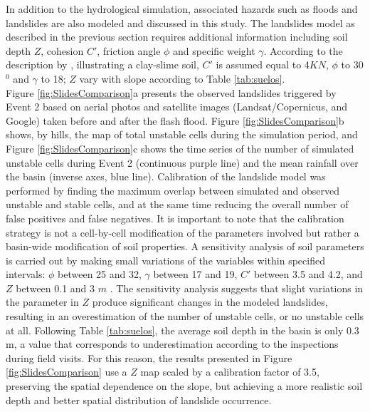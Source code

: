 \documentclass[hess, manuscript]{copernicus} %
\begin{document}
In addition to the hydrological simulation, associated hazards such as floods and landslides are also modeled and discussed in this study. The landslides model as described in the previous section requires additional information including soil depth $Z$, cohesion $C'$, friction angle $\phi$ and specific weight $\gamma$.  According to the  description by  \citet{Osorio2008}, illustrating a clay-slime soil,   $C'$  is  assumed equal to 4$KN$, $\phi$ to 30$^0$ and $\gamma$ to 18; $Z$ vary with slope according to Table \ref{tab:suelos}. \\

Figure \ref{fig:SlidesComparison}a presents the observed landslides triggered by Event 2  based on aerial photos and satellite images (Landsat/Copernicus, and Google) taken before and after the flash flood.  Figure \ref{fig:SlidesComparison}b shows,  by hills, the map of total unstable cells during the simulation period, and Figure \ref{fig:SlidesComparison}c shows the time series of the number of simulated unstable cells during Event 2 (continuous purple line) and the mean rainfall over the basin (inverse axes, blue line). Calibration of the landslide model was performed by finding the maximum overlap between simulated and observed unstable and stable cells, and at the same time reducing the overall number of false positives and false negatives. It is important to note that the calibration strategy is not a cell-by-cell modification of the parameters involved but rather a basin-wide modification of soil properties. A sensitivity analysis of soil parameters is carried out by making small variations of the variables within specified intervals: $\phi$ between 25 and 32, $\gamma$ between 17 and 19,  $C'$ between 3.5 and 4.2, and $Z$ between 0.1 and 3 $m$ . The sensitivity analysis suggests that slight variations in the parameter in $Z$ produce significant changes in the modeled landslides, resulting in an overestimation of the number of unstable cells, or no unstable cells at all. Following Table \ref{tab:suelos}, the average soil depth in the basin is only 0.3 m, a value that corresponds to underestimation according to the inspections during field visits. For this reason, the results presented in Figure \ref{fig:SlidesComparison} use a  $Z$ map scaled by a calibration factor of 3.5, preserving the spatial dependence on the slope, but achieving a more realistic soil depth and better spatial distribution of landslide occurrence.\\ 
\end{document}
